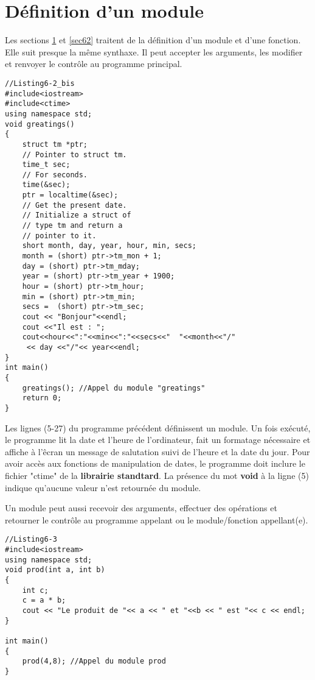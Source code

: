 \documentclass[a4paper, oneside,11pt]{book}
\begin{document}
\section{D\'efinition d'un module}\label{sec61} 

Les sections \ref{sec61}  et \ref{sec62} traitent de la d\'efinition d'un module et d'une fonction. Elle suit presque la m\^eme synthaxe. Il peut accepter les arguments, les modifier et
renvoyer le contr\^ole au programme principal.


\begin{lstlisting}
//Listing6-2_bis
#include<iostream>
#include<ctime>
using namespace std;
void greatings()
{
    struct tm *ptr;
    // Pointer to struct tm.
    time_t sec;
    // For seconds.
    time(&sec);
    ptr = localtime(&sec);
    // Get the present date.
    // Initialize a struct of
    // type tm and return a
    // pointer to it.
    short month, day, year, hour, min, secs;
    month = (short) ptr->tm_mon + 1;
    day = (short) ptr->tm_mday;
    year = (short) ptr->tm_year + 1900;
    hour = (short) ptr->tm_hour;
    min = (short) ptr->tm_min;
    secs =  (short) ptr->tm_sec;
    cout << "Bonjour"<<endl;
    cout <<"Il est : ";
    cout<<hour<<":"<<min<<":"<<secs<<"  "<<month<<"/"
     << day <<"/"<< year<<endl;
}
int main()
{
    greatings(); //Appel du module "greatings"
    return 0;
}
\end{lstlisting}

Les lignes (5-27) du programme pr\'ec\'edent d\'efinissent un module. Un fois ex\'ecut\'e, le programme lit la date et l'heure de l'ordinateur, fait un formatage n\'ecessaire
et affiche \`a l'\^ecran un message de salutation suivi de l'heure et la date du jour. Pour avoir acc\`es aux fonctions de manipulation de dates, le programme doit inclure le fichier
"ctime" de la  \textbf{librairie standtard}. La pr\'esence du mot \textbf{void} \`a la ligne (5) indique qu'aucune valeur n'est retourn\'ee du module.

Un module peut aussi recevoir des arguments, effectuer des op\'erations et retourner le contr\^ole au programme appelant ou le module/fonction appellant(e).

\begin{lstlisting}
//Listing6-3
#include<iostream>
using namespace std;
void prod(int a, int b)
{
    int c;
    c = a * b;
    cout << "Le produit de "<< a << " et "<<b << " est "<< c << endl;
} 

int main()
{
    prod(4,8); //Appel du module prod
}
\end{lstlisting}
\end{document}
